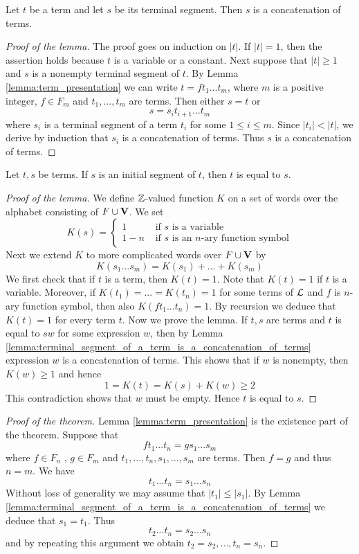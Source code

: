 \documentclass[10pt]{amsart}
\begin{document}
\begin{lemma}\label{lemma:terminal_segment_of_a_term_is_a_concatenation_of_terms}
	Let $t$ be a term and let $s$ be its terminal segment. Then $s$ is a concatenation of terms.
\end{lemma}
\begin{proof}[Proof of the lemma]
	The proof goes on induction on $|t|$. If $|t| = 1$, then the assertion holds because $t$ is a variable or a constant. Next suppose that $|t| \geq 1$ and $s$ is a nonempty terminal segment of $t$. By Lemma \ref{lemma:term_presentation} we can write $t = ft_1...t_m$, where $m$ is a positive integer, $f \in F_m$ and $t_1,...,t_m$ are terms. Then
	either $s = t$ or
	$$s = s_it_{i+1}...t_m$$
	where $s_i$ is a terminal segment of a term $t_i$ for some $1 \leq i \leq m$. Since $|t_i|<|t|$, we derive by induction that $s_i$ is a concatenation of terms. Thus $s$ is a concatenation of terms.
\end{proof}

\begin{lemma}
	Let $t,s$ be terms. If $s$ is an initial segment of $t$, then $t$ is equal to $s$.
\end{lemma}
\begin{proof}[Proof of the lemma]
	We define ${\mathbb Z}$-valued function $K$ on a set of words over the alphabet consisting of $F \cup \mathbf{V}$. We set
	$$K(s) =\begin{cases}1   & \mbox{ if }s\mbox{ is a variable}                 \\
             1-n & \mbox{ if }s\mbox{ is an $n$-ary function symbol}
		\end{cases}$$
	Next we extend $K$ to more complicated words over $F \cup \mathbf{V}$ by
	$$K(s_1 ...s_m) = K(s_1) + ... + K(s_m)$$
	We first check that if $t$ is a term, then $K(t) = 1$. Note that $K(t) = 1$ if $t$ is a variable. Moreover, if $K(t_1) = ... = K(t_n) = 1$ for some terms of ${\mathcal L}$ and $f$ is $n$-ary function symbol, then also $K( ft_1...t_n) = 1$.
	By recursion we deduce that $K(t) = 1$ for every term $t$. Now we prove the lemma. If $t, s$ are terms and $t$ is equal to $sw$ for some expression $w$, then by Lemma \ref{lemma:terminal_segment_of_a_term_is_a_concatenation_of_terms} expression $w$ is a concatenation of terms. This shows that if $w$ is nonempty, then $K(w) \geq 1$ and hence
	$$1 = K(t) = K(s) + K(w) \geq 2$$
	This contradiction shows that $w$ must be empty. Hence $t$ is equal to $s$.
\end{proof}

\begin{proof}[Proof of the theorem]
	Lemma \ref{lemma:term_presentation} is the existence part of the theorem. Suppose that
	$$ft_1 ...t_n = gs_1 ...s_m$$
	where $f \in F_n$ , $g \in F_m$ and $t_1, ..., t_n , s_1 , ..., s_m$ are terms. Then $f = g$ and thus $n = m$. We have
	$$t_1 ...t_n = s_1 ...s_n$$
	Without loss of generality we may assume that $|t_1| \leq |s_1|$. By Lemma \ref{lemma:terminal_segment_of_a_term_is_a_concatenation_of_terms} we deduce that $s_1 = t_1$.
	Thus
	$$t_2 ...t_n = s_2 ...s_n$$
	and by repeating this argument we obtain $t_2 = s_2 ,...,t_n = s_n$.
\end{proof}
\end{document}
